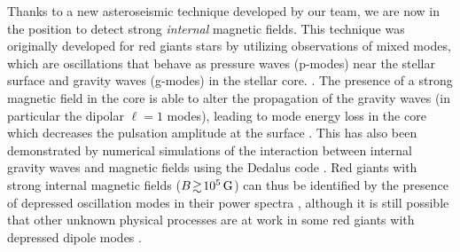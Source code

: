 Thanks to a new asteroseismic technique developed by our team, we are now in the position to detect strong {\it internal} magnetic fields. This technique was originally developed for red giants stars by utilizing observations of mixed modes, which are oscillations that behave as pressure waves (p-modes) near the stellar surface and gravity waves (g-modes) in the stellar core. \citep[e.g][]{Beck_2011}. The presence of a strong magnetic field in the core is able to alter the propagation of the gravity waves (in particular the dipolar $\ell =1$ modes),
leading to mode energy loss in the core which decreases the pulsation amplitude at the surface \citep{Fuller_2015}. This has also been demonstrated by numerical simulations of the interaction between internal gravity waves and magnetic fields using the Dedalus code \citep{Lecoanet_2016}. Red giants with strong internal magnetic fields ($B \! \gtrsim \! 10^5 \, {\rm G}$) can thus be identified by the presence of depressed oscillation modes in their power spectra \citep{Fuller_2015,Stello_2016}, 
although it is still possible that other unknown physical processes are at work in some red giants with depressed dipole modes \citet{Mosser_2017}. 
